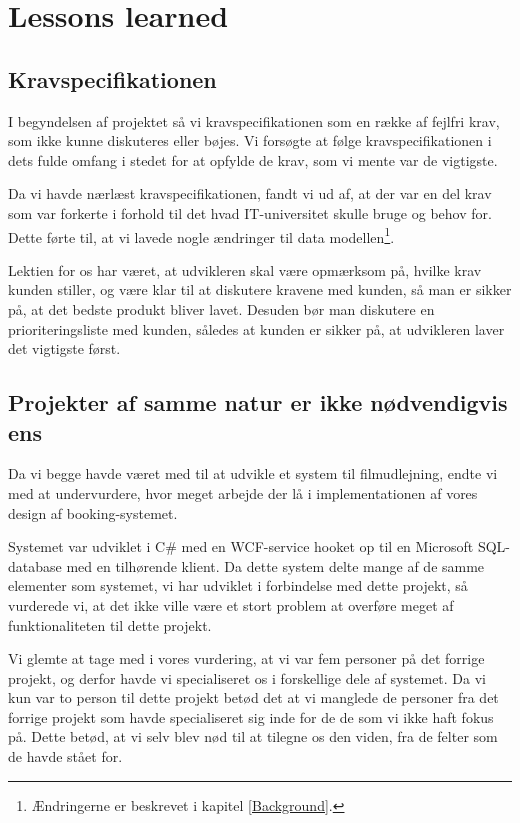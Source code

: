 \section{Lessons learned}
\label{Conclusion_Lessons}
\subsection{Kravspecifikationen}
\label{Conclusion_Lessons_Krav}
I begyndelsen af projektet så vi kravspecifikationen som en række af fejlfri krav, som ikke kunne diskuteres eller bøjes. Vi forsøgte at følge kravspecifikationen i dets fulde omfang i stedet for at opfylde de krav, som vi mente var de vigtigste.

Da vi havde nærlæst kravspecifikationen, fandt vi ud af, at der var en del krav som var forkerte i forhold til det hvad IT-universitet skulle bruge og behov for. Dette førte til, at vi lavede nogle ændringer til data modellen\footnote{Ændringerne er beskrevet i kapitel \ref{Background}.}.

Lektien for os har været, at udvikleren skal være opmærksom på, hvilke krav kunden stiller, og være klar til at diskutere kravene med kunden, så man er sikker på, at det bedste produkt bliver lavet. Desuden bør man diskutere en prioriteringsliste med kunden, således at kunden er sikker på, at udvikleren laver det vigtigste først.

\subsection{Projekter af samme natur er ikke nødvendigvis ens}
\label{Conclusion_Lessons_Projekt}
Da vi begge havde været med til at udvikle et system til filmudlejning, endte vi med at undervurdere, hvor meget arbejde der lå i implementationen af vores design af booking-systemet.

Systemet var udviklet i C\# med en WCF-service hooket op til en Microsoft SQL-database med en tilhørende klient. Da dette system delte mange af de samme elementer som systemet, vi har udviklet i forbindelse med dette projekt, så vurderede vi, at det ikke ville være et stort problem at overføre meget af funktionaliteten til dette projekt.

Vi glemte at tage med i vores vurdering, at vi var fem personer på det forrige projekt, og derfor havde vi specialiseret os i forskellige dele af systemet. Da vi kun var to person til dette projekt betød det at vi manglede de personer fra det forrige projekt som havde specialiseret sig inde for de de som vi ikke haft fokus på. Dette betød, at vi selv blev nød til at tilegne os den viden, fra de felter som de havde stået for.

